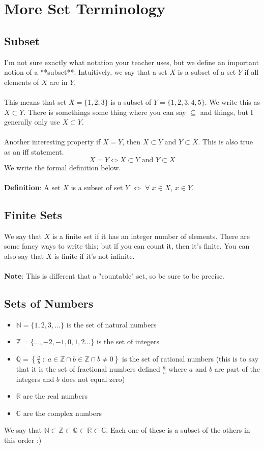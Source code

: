 \section{More Set Terminology}
\subsection{Subset}
I'm not sure exactly what notation your teacher uses, but we define an important notion of a **subset**. Intuitively, we say that a set $X$ is a subset of a set $Y$ if all elements of $X$ are in $Y$. \\
\\
This means that set $X = \{1,2,3\}$ is a subset of $Y = \{1,2,3,4,5\}$. We write this as $X \subset Y$. There is somethings some thing where you can say $\subseteq$ and things, but I generally only use $X \subset Y$. \\
\\
Another interesting property if $X = Y$, then $X \subset Y$ and $Y \subset X$. This is also true as an iff statement.
$$
X = Y \iff X \subset Y \text{ and } Y \subset X
$$
We write the formal definition below.\\
\\
\textbf{Definition}: A set $X$ is a subset of set $Y$ $\iff$ $\forall \;x\in X$, $x \in Y$.  

\subsection{Finite Sets}

We say that $X$ is a finite set if it has an integer number of elements. There are some fancy ways to write this; but if you can count it, then it's finite. You can also say that $X$ is finite if it's not infinite.\\
\\
\textbf{Note}: This is different that a "countable" set, so be sure to be precise.

\subsection{Sets of Numbers}
\begin{itemize}
    \item $\mathbb{N} = \{1,2,3,\dots\}$ is the set of natural numbers 
    \item $\mathbb{Z} = \{\dots,-2,-1,0,1,2\dots\}$ is the set of integers
    \item $\mathbb{Q} = \left\{\frac{a}{b}\;:\; a \in \mathbb{Z} \cap b \in \mathbb{Z} \cap b \neq 0\right\}$ is the set of rational numbers (this is to say that it is the set of fractional numbers defined $\frac{a}{b}$ where $a$ and $b$ are part of the integers and $b$ does not equal zero)
    \item $\mathbb{R}$ are the real numbers
    \item $\mathbb{C}$ are the complex numbers
\end{itemize}
We say that $\mathbb{N} \subset \mathbb{Z} \subset \mathbb{Q} \subset \mathbb{R} \subset \mathbb{C}$. Each one of these is a subset of the others in this order :)

